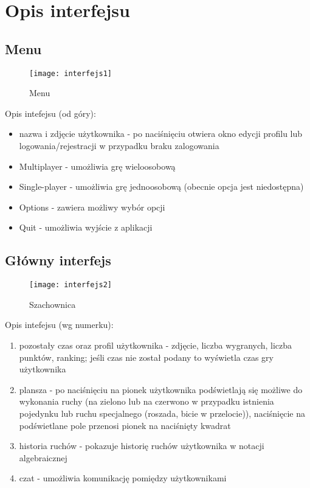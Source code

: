 \documentclass[12pt]{article}
\begin{document}
\newpage
\section{Opis interfejsu}
\subsection{Menu}

\begin{figure}[!ht]
  \centering
	\texttt{[image: interfejs1]}
  \caption{Menu}
\end{figure}

Opis intefejsu (od góry):
\begin{itemize}
\item nazwa i zdjęcie użytkownika - po naciśnięciu otwiera okno edycji profilu lub logowania/rejestracji w przypadku braku zalogowania
\item Multiplayer - umożliwia grę wieloosobową
\item Single-player - umożliwia grę jednoosobową (obecnie opcja jest niedostępna)
\item Options - zawiera możliwy wybór opcji
\item Quit - umożliwia wyjście z aplikacji
\end{itemize}
\newpage
\subsection{Główny interfejs}

\begin{figure}[!ht]
  \centering
	\texttt{[image: interfejs2]}
  \caption{Szachownica}
\end{figure}

Opis intefejsu (wg numerku):
\begin{enumerate}
\item pozostały czas oraz profil użytkownika - zdjęcie, liczba wygranych, liczba punktów, ranking; jeśli czas nie został podany to wyświetla czas gry użytkownika
\item plansza - po naciśnięciu na pionek użytkownika podświetlają się możliwe do wykonania ruchy (na zielono lub na czerwono w przypadku istnienia pojedynku lub ruchu specjalnego (roszada, bicie w przelocie)), naciśnięcie na podświetlane pole przenosi pionek na naciśnięty kwadrat
\item historia ruchów - pokazuje historię ruchów użytkownika w notacji algebraicznej
\item czat - umożliwia komunikację pomiędzy użytkownikami
\end{enumerate}
\newpage
\end{document}
